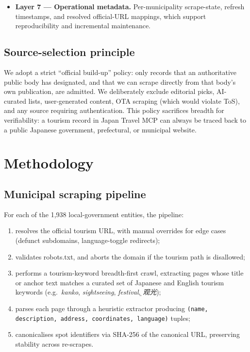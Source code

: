 \documentclass[11pt,a4paper]{article}
\begin{document}
\begin{itemize}
  All Layer 6 records are translated into the same 17 languages
  (11{,}730 cells).

  \item \textbf{Layer 7 — Operational metadata.} Per-municipality
  scrape-state, refresh timestamps, and resolved official-URL mappings,
  which support reproducibility and incremental maintenance.
\end{itemize}

\subsection{Source-selection principle}

We adopt a strict ``official build-up'' policy: only records that an
authoritative public body has designated, and that we can scrape directly
from that body's own publication, are admitted. We deliberately exclude
editorial picks, AI-curated lists, user-generated content, OTA scraping
(which would violate ToS), and any source requiring authentication.
This policy sacrifices breadth for verifiability: a tourism record in
Japan Travel MCP can always be traced back to a public Japanese
government, prefectural, or municipal website.

\section{Methodology}
\label{sec:method}

\subsection{Municipal scraping pipeline}

For each of the 1{,}938 local-government entities, the pipeline:
\begin{enumerate}
  \item resolves the official tourism URL, with manual overrides for
  edge cases (defunct subdomains, language-toggle redirects);
  \item validates robots.txt, and aborts the domain if the
  tourism path is disallowed;
  \item performs a tourism-keyword breadth-first crawl, extracting
  pages whose title or anchor text matches a curated set of Japanese
  and English tourism keywords (e.g.\ \emph{kanko}, \emph{sightseeing},
  \emph{festival}, \emph{\d{}观光});
  \item parses each page through a heuristic extractor producing
  \texttt{(name, description, address, coordinates, language)} tuples;
  \item canonicalises spot identifiers via SHA-256 of the canonical URL,
  preserving stability across re-scrapes.
\end{enumerate}
\end{document}
